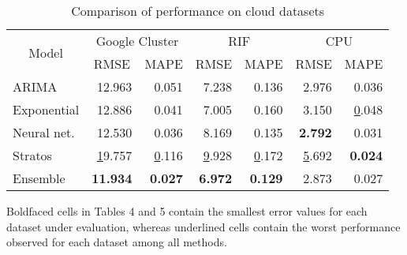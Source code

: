 \begin{table}[]
\centering
\caption{Comparison of performance on cloud datasets}
\label{my-label}
\begin{tabular}{|l|r|r|r|r|r|r|}
\hline
\multicolumn{1}{|c|}{\multirow{2}{*}{Model}} & \multicolumn{2}{c|}{Google Cluster}                   & \multicolumn{2}{c|}{RIF}                              & \multicolumn{2}{c|}{CPU}                              \\ \cline{2-7} 
\multicolumn{1}{|c|}{}                       & \multicolumn{1}{c|}{RMSE} & \multicolumn{1}{c|}{MAPE} & \multicolumn{1}{c|}{RMSE} & \multicolumn{1}{c|}{MAPE} & \multicolumn{1}{c|}{RMSE} & \multicolumn{1}{c|}{MAPE} \\ \hline
ARIMA                                        & 12.963                    & 0.051                     & 7.238                     & 0.136                     & 2.976                     & 0.036                     \\ \hline
Exponential                                  & 12.886                    & 0.041                     & 7.005                     & 0.160                     & 3.150                     & {\ul 0.048}               \\ \hline
Neural net.                                  & 12.530                    & 0.036                     & 8.169                     & 0.135                     & \textbf{2.792}            & 0.031                     \\ \hline
Stratos                                      & {\ul 19.757}              & {\ul 0.116}               & {\ul 9.928}               & {\ul 0.172}               & {\ul 5.692}               & \textbf{0.024}            \\ \hline
Ensemble                                     & \textbf{11.934}           & \textbf{0.027}            & \textbf{6.972}            & \textbf{0.129}            & 2.873                     & 0.027                     \\ \hline
\end{tabular}
\end{table}

Boldfaced cells in Tables 4 and 5 contain the smallest error values for each dataset under evaluation, whereas underlined cells contain the worst performance observed for each dataset among all methods.

